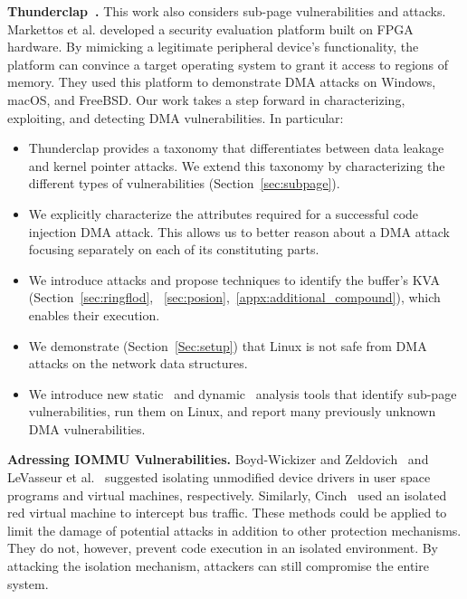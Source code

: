 \smallskip
\noindent\textbf{Thunderclap~\cite{thunder}.} This work also considers sub-page vulnerabilities and \simple attacks. Markettos et al. developed a security evaluation platform built on FPGA hardware. By mimicking a legitimate peripheral device's functionality, the platform can convince a target operating system to grant it access to regions of memory. They used this platform to demonstrate \simple DMA attacks on Windows, macOS, and FreeBSD.
Our work takes a step forward in characterizing, exploiting, and detecting DMA vulnerabilities. In particular:
\begin{itemize}

    \item Thunderclap provides a taxonomy that differentiates between data leakage and kernel pointer attacks. We extend this taxonomy by characterizing the different types of \subpage vulnerabilities (Section~\ref{sec:subpage}).
    
    \item We explicitly characterize the attributes required for a successful code injection DMA attack. This allows us to better reason about a DMA attack focusing separately on each of its constituting parts. 
    
    \item We introduce \compound attacks and propose techniques to identify the buffer's KVA (Section~\ref{sec:ringflod}, ~\ref{sec:posion},~\ref{appx:additional_compound}), which enables their execution.
    
    \item We demonstrate (Section~\ref{Sec:setup}) that Linux is not safe from DMA attacks on the network data structures.
    
    \item We introduce new static~\cite{SPADE} and dynamic~\cite{DKASAN} analysis tools that identify sub-page vulnerabilities, run them on Linux, and report many previously unknown DMA vulnerabilities.
    
\end{itemize}





\smallskip
\noindent\textbf{Adressing IOMMU Vulnerabilities.}
Boyd-Wickizer and Zeldovich~\cite{BWZ10} and LeVasseur et al.~\cite{LUSG04} suggested isolating unmodified device drivers in user space programs and virtual machines, respectively. Similarly, Cinch~\cite{AWH16} used an isolated red virtual machine to intercept bus traffic. These methods could be applied to limit the damage of potential attacks in addition to other protection mechanisms. They do not, however, prevent code execution in an isolated environment. By attacking the isolation mechanism, attackers can still compromise the entire system.

